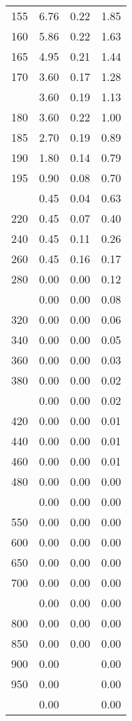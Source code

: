 \begin{table}[ht]
\begin{tabular}{lccc}
  155 & 6.76 & 0.22 & 1.85 \\ 
  160 & 5.86 & 0.22 & 1.63 \\ 
  165 & 4.95 & 0.21 & 1.44 \\ 
  170 & 3.60 & 0.17 & 1.28 \\ 
   \addlinespace
175 & 3.60 & 0.19 & 1.13 \\ 
  180 & 3.60 & 0.22 & 1.00 \\ 
  185 & 2.70 & 0.19 & 0.89 \\ 
  190 & 1.80 & 0.14 & 0.79 \\ 
  195 & 0.90 & 0.08 & 0.70 \\ 
   \addlinespace
200 & 0.45 & 0.04 & 0.63 \\ 
  220 & 0.45 & 0.07 & 0.40 \\ 
  240 & 0.45 & 0.11 & 0.26 \\ 
  260 & 0.45 & 0.16 & 0.17 \\ 
  280 & 0.00 & 0.00 & 0.12 \\ 
   \addlinespace
300 & 0.00 & 0.00 & 0.08 \\ 
  320 & 0.00 & 0.00 & 0.06 \\ 
  340 & 0.00 & 0.00 & 0.05 \\ 
  360 & 0.00 & 0.00 & 0.03 \\ 
  380 & 0.00 & 0.00 & 0.02 \\ 
   \addlinespace
400 & 0.00 & 0.00 & 0.02 \\ 
  420 & 0.00 & 0.00 & 0.01 \\ 
  440 & 0.00 & 0.00 & 0.01 \\ 
  460 & 0.00 & 0.00 & 0.01 \\ 
  480 & 0.00 & 0.00 & 0.00 \\ 
   \addlinespace
500 & 0.00 & 0.00 & 0.00 \\ 
  550 & 0.00 & 0.00 & 0.00 \\ 
  600 & 0.00 & 0.00 & 0.00 \\ 
  650 & 0.00 & 0.00 & 0.00 \\ 
  700 & 0.00 & 0.00 & 0.00 \\ 
   \addlinespace
750 & 0.00 & 0.00 & 0.00 \\ 
  800 & 0.00 & 0.00 & 0.00 \\ 
  850 & 0.00 & 0.00 & 0.00 \\ 
  900 & 0.00 &  & 0.00 \\ 
  950 & 0.00 &  & 0.00 \\ 
   \addlinespace
1000 & 0.00 &  & 0.00 \\ 
   \bottomrule
\end{tabular}
\end{table}

